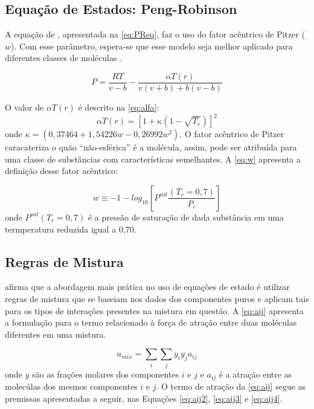\subsection{Equação de Estados: Peng-Robinson}

 A equação de , apresentada na
 \autoref{eq:PReq}, faz o uso do fator acêntrico de Pitzer ($w$). Com esse 
 parâmetro, espera-se que esse modelo seja melhor aplicado para diferentes classes
 de moléculas \cite{Koretsky2013}.
      
\begin{equation}\label{eq:PReq}
P = \frac{RT}{v - b} - \frac{\alpha T(r)}{v(v+b)+b(v-b)}
\end{equation} 

O valor de $\alpha T(r)$ é descrito na \autoref{eq:alfa}:
 \begin{equation}\label{eq:alfa}
\alpha T(r) = [1 +
 \kappa(1-\sqrt{T_r})]^2
\end{equation} 
onde $\kappa = (0,37464+1,54226w-0,26992w^2)$. 
 O fator acêntrico de Pitzer caracateriza o quão ``não-esférica'' é a molécula,
 assim, pode ser atribuída para uma classe de substâncias com
 características semelhantes. A \autoref{eq:w} apresenta a definição desse fator
 acêntrico:
 
  \begin{equation}\label{eq:w}
w \equiv -1 - log_{10}\left [ P^{sat} \frac{( T_r = 0,7 )}{P_c}
\right ]
\end{equation} 
onde $ P^{sat} \left ( T_r = 0,7 \right )$ é a pressão de saturação de dada
substância em uma termperatura reduzida igual a 0,70.

\subsection{Regras de Mistura}

 afirma que a abordagem mais prática no uso de equações de estado
é utilizar regras de mistura que se baseiam nos dados dos componentes puros e 
aplicam tais para os tipos de interações presentes na mistura em questão. A 
\autoref{eq:aij} apresenta a formulação para o termo relacionado à força de
atração entre duas moléculas diferentes em uma mistura.

\begin{equation}\label{eq:aij}
a_{mix} = \sum_i\sum_jy_iy_ja_{ij}
\end{equation}
onde $y$ são as frações molares dos componentes $i$ e $j$ e $a_{ij}$ é a
atração entre as molecúlas dos mesmos componentes $i$ e $j$. O termo de atração
da \autoref{eq:aij} segue as premissas apresentadas a seguir, nas Equações
\ref{eq:aij2}, \ref{eq:aij3} e \ref{eq:aij4}. 

